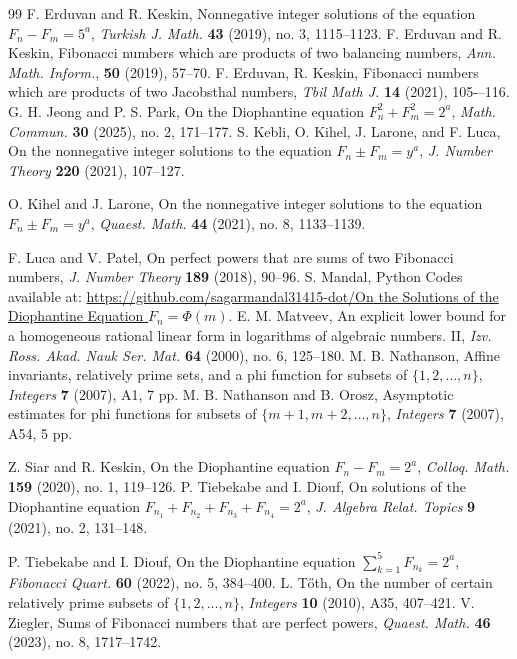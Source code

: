 \documentclass[12pt,reqno]{amsart}
\begin{document}
\begin{thebibliography}{99}
F. Erduvan and R. Keskin,
{Nonnegative integer solutions of the equation $F_n-F_m=5^a$},
\emph{Turkish J. Math.} \textbf{43} (2019), no. 3, 1115--1123.
 F. Erduvan and R. Keskin, Fibonacci numbers which are products of two balancing numbers, \emph{Ann.
Math. Inform.}, \textbf{50} (2019), 57--70.
 F. Erduvan, R. Keskin, Fibonacci numbers which are products of two Jacobsthal numbers, \emph{Tbil Math J.} \textbf{14} (2021), 105-–116.
G. H. Jeong and P. S. Park,
{On the Diophantine equation $F_n^2+F_m^2=2^a$},
\emph{Math. Commun.} \textbf{30} (2025), no. 2, 171--177.
S. Kebli, O. Kihel, J. Larone, and F. Luca,
{On the nonnegative integer solutions to the equation $F_n\pm F_m=y^a$},
\emph{J. Number Theory} \textbf{220} (2021), 107--127.

O. Kihel and J. Larone,
{On the nonnegative integer solutions to the equation $F_n\pm F_m=y^a$},
\emph{Quaest. Math.} \textbf{44} (2021), no. 8, 1133--1139.

F. Luca and V. Patel,
{On perfect powers that are sums of two Fibonacci numbers},
\emph{J. Number Theory} \textbf{189} (2018), 90--96.
 S. Mandal, Python Codes available at: \href{https://github.com/sagarmandal31415-dot/On-the-Solutions-of-the-Diophantine-Equation-F_n-Phi-m-/tree/main}{https://github.com/sagarmandal31415-dot/On the Solutions of the Diophantine Equation $F_n=\Phi(m)$}.
E. M. Matveev,
{An explicit lower bound for a homogeneous rational linear form in logarithms of algebraic numbers. II},
\emph{Izv. Ross. Akad. Nauk Ser. Mat.} \textbf{64} (2000), no. 6, 125--180.
M. B. Nathanson,
Affine invariants, relatively prime sets, and a phi function for subsets of $\{1,2,\dots,n\}$,
\textit{Integers} \textbf{7} (2007), A1, 7 pp.
M. B. Nathanson and B. Orosz,
Asymptotic estimates for phi functions for subsets of $\{m+1,m+2,\dots,n\}$,
\textit{Integers} \textbf{7} (2007), A54, 5 pp.

Z. Siar and R. Keskin,
{On the Diophantine equation $F_n-F_m=2^a$},
\emph{Colloq. Math.} \textbf{159} (2020), no. 1, 119--126.
P. Tiebekabe and I. Diouf,
{On solutions of the Diophantine equation $F_{n_1}+F_{n_2}+F_{n_3}+F_{n_4}=2^a$},
\emph{J. Algebra Relat. Topics} \textbf{9} (2021), no. 2, 131--148.

P. Tiebekabe and I. Diouf,
{On the Diophantine equation $\sum_{k=1}^{5}F_{n_k}=2^a$},
\emph{Fibonacci Quart.} \textbf{60} (2022), no. 5, 384--400.
L. T\H{o}th,
On the number of certain relatively prime subsets of $\{1,2,\ldots,n\}$,
\textit{Integers} \textbf{10} (2010), A35, 407–421.
V. Ziegler,
{Sums of Fibonacci numbers that are perfect powers},
\emph{Quaest. Math.} \textbf{46} (2023), no. 8, 1717--1742.

\end{thebibliography}
\end{document}
